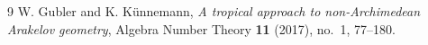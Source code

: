 \documentclass[11pt]{article}
\begin{document}




\begin{thebibliography}{9}
W. Gubler and K. K\"unnemann,
\emph{A tropical approach to non-Archimedean Arakelov geometry},
Algebra Number Theory \textbf{11} (2017), no.~1, 77--180.
\end{thebibliography}
\end{document}
